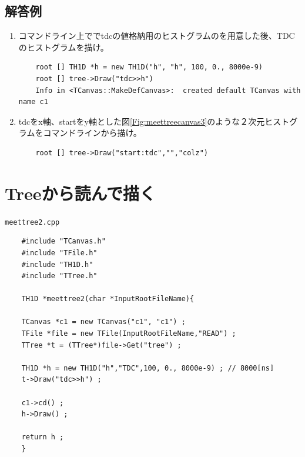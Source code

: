   \subsection{解答例}
  \begin{enumerate}
   \item コマンドライン上ででtdcの値格納用のヒストグラムのを用意した後、TDCのヒストグラムを描け。
\begin{verbatim}
	root [] TH1D *h = new TH1D("h", "h", 100, 0., 8000e-9)
	root [] tree->Draw("tdc>>h")
	Info in <TCanvas::MakeDefCanvas>:  created default TCanvas with name c1
\end{verbatim}
   \item tdcをx軸、startをy軸とした図\ref{Fig:meettreecanvas3}のような２次元ヒストグラムをコマンドラインから描け。
\begin{verbatim}
	root [] tree->Draw("start:tdc","","colz")
\end{verbatim}
  \end{enumerate}


 \section{Treeから読んで描く}

 \begin{itembox}{\texttt{meettree2.cpp}}
\begin{verbatim}
	#include "TCanvas.h"
	#include "TFile.h"
	#include "TH1D.h"
	#include "TTree.h"

	TH1D *meettree2(char *InputRootFileName){

	TCanvas *c1 = new TCanvas("c1", "c1") ;
	TFile *file = new TFile(InputRootFileName,"READ") ;
	TTree *t = (TTree*)file->Get("tree") ;

	TH1D *h = new TH1D("h","TDC",100, 0., 8000e-9) ; // 8000[ns]
	t->Draw("tdc>>h") ;

	c1->cd() ;
	h->Draw() ;

	return h ;
	}
\end{verbatim}
 \end{itembox}


